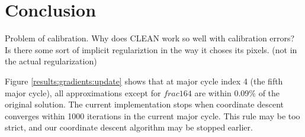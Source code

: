 \section{Conclusion}

Problem of calibration.
Why does CLEAN work so well with calibration errors? Is there some sort of implicit regulariztion in the way it choses its pixels. (not in the actual regularization)

Figure \ref{results:gradients:update} shows that at major cycle index 4 (the fifth major cycle), all approximations except for $frac{1}{64}$ are within 0.09\% of the original solution. The current implementation stops when coordinate descent converges within 1000 iterations in the current major cycle. This rule may be too strict, and our coordinate descent algorithm may be stopped earlier. 